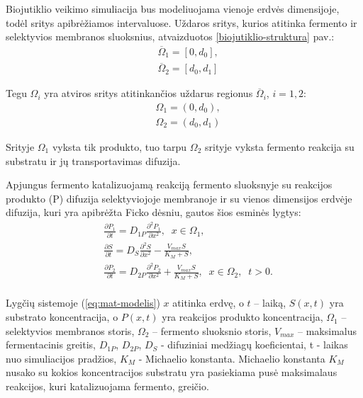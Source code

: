 \documentclass[12pt, a4paper, lithuanian]{article}
\begin{document}
Biojutiklio veikimo simuliacija bus modeliuojama vienoje erdvės dimensijoje,
todėl sritys apibrėžiamos intervaluose. Uždaros sritys, kurios atitinka fermento ir selektyvios
membranos sluoksnius, atvaizduotos \ref{biojutiklio-struktura} pav.:
\begin{equation}
\begin{aligned}
    &\overline{\Omega}_1 = [0, d_0],\\
    &\overline{\Omega}_2 = [d_0, d_1]
\end{aligned}
\end{equation}

Tegu $\Omega_i$ yra atviros sritys atitinkančios uždarus regionus
$\overline{\Omega}_i$, $i = 1, 2$:
\begin{equation}
\begin{aligned}
    &\Omega_1 = (0, d_0),\\
    &\Omega_2 = (d_0, d_1)
\end{aligned}
\end{equation}

Srityje $\Omega_1$ vyksta tik produkto, tuo tarpu $\Omega_2$ srityje vyksta fermento
reakcija su substratu ir jų transportavimas difuzija.

Apjungus fermento katalizuojamą reakciją fermento sluoksnyje su reakcijos
produkto (P) difuzija selektyviojoje membranoje ir su vienos
dimensijos erdvėje difuzija, kuri yra apibrėžta Ficko dėsniu, gautos šios
esminės lygtys:
\begin{equation}
\begin{aligned} 
    \label{eq:mat-modelis}
    &\frac{\partial P_1}{\partial t} = D_{1P} \frac{\partial^2 P_1}{\partial x^2}, \;
    \; x \in \Omega_1,\\
    &\frac{\partial S}{\partial t} = D_S \frac{\partial^2 S}{\partial x^2} -
    \frac{V_{max} S}{K_M + S},  \\ 
    &\frac{\partial P_2}{\partial t} = D_{2P} \frac{\partial^2 P_2}{\partial x^2} +
    \frac{V_{max} S}{K_M + S}, \; \; x \in \Omega_2 ,\;\; t > 0.\\
\end{aligned}
\end{equation}

Lygčių sistemoje (\ref{eq:mat-modelis}) $x$ atitinka erdvę, o $t$ – laiką, $S(x, t)$
yra substrato koncentracija, o $P(x, t)$ yra reakcijos produkto koncentracija,
$\Omega_1$ – selektyvios membranos storis, $\Omega_2$ – fermento sluoksnio
storis, $V_{max}$ – maksimalus fermentacinis greitis, $ D_{1P}$, $ D_{2P}$, $ D_S$ - difuziniai medžiagų koeficientai, t - laikas nuo
simuliacijos pradžios, $ K_M$ - Michaelio konstanta. Michaelio konstanta $K_M$
nusako su kokios koncentracijos substratu yra pasiekiama pusė maksimalaus
reakcijos, kuri katalizuojama fermento, greičio.
\end{document}
